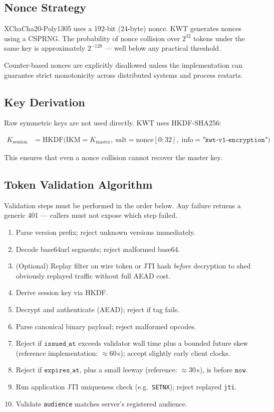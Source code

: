 \documentclass[11pt, letterpaper]{article}
\begin{document}
\subsection{Nonce Strategy}

XChaCha20-Poly1305 uses a 192-bit (24-byte) nonce. KWT generates nonces using
a CSPRNG. The probability of nonce collision over $2^{32}$ tokens under the
same key is approximately $2^{-128}$ — well below any practical threshold.

Counter-based nonces are explicitly disallowed unless the implementation can
guarantee strict monotonicity across distributed systems and process restarts.

\subsection{Key Derivation}

Raw symmetric keys are not used directly. KWT uses HKDF-SHA256:

\begin{align}
  K_{\text{session}} &= \mathrm{HKDF}\bigl(
    \text{IKM}=K_{\text{master}},\;
    \text{salt}=\text{nonce}[0{:}32],\;
    \text{info}=\texttt{"kwt-v1-encryption"}\bigr)
  \label{eq:hkdf}
\end{align}

This ensures that even a nonce collision cannot recover the master key.

\subsection{Token Validation Algorithm}

Validation steps must be performed in the order below.
Any failure returns a generic 401 — callers must not expose which step failed.

\begin{enumerate}[noitemsep]
  \item Parse version prefix; reject unknown versions immediately.
  \item Decode base64url segments; reject malformed base64.
  \item (Optional) Replay filter on wire token or JTI hash \emph{before} decryption
        to shed obviously replayed traffic without full AEAD cost.
  \item Derive session key via HKDF.
  \item Decrypt and authenticate (AEAD); reject if tag fails.
  \item Parse canonical binary payload; reject malformed opcodes.
  \item Reject if $\mathtt{issued\_at}$ exceeds validator wall time plus a bounded future
        skew (reference implementation: $\approx 60$\,s); accept slightly early client clocks.
  \item Reject if $\mathtt{expires\_at}$, plus a small leeway (reference: $\approx 30$\,s),
        is before $\mathtt{now}$.
  \item Run application JTI uniqueness check (e.g.\ \texttt{SETNX}); reject replayed \texttt{jti}.
  \item Validate \texttt{audience} matches server's registered audience.
\end{enumerate}
\end{document}
